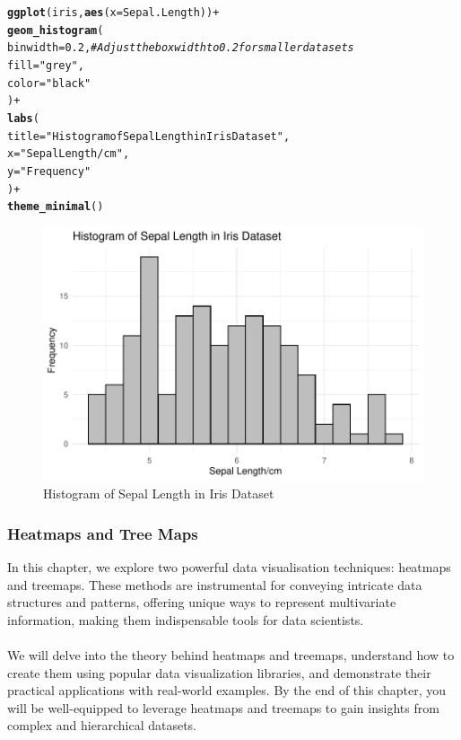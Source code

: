 \documentclass{article}\usepackage[]{graphicx}\usepackage[]{xcolor}
\makeatletter
\def\maxwidth{ %
  \ifdim\Gin@nat@width>\linewidth
    \linewidth
  \else
    \Gin@nat@width
  \fi
}
\newcommand{\hlnum}[1]{\textcolor[rgb]{0.686,0.059,0.569}{#1}}%
\newcommand{\hlstr}[1]{\textcolor[rgb]{0.192,0.494,0.8}{#1}}%
\newcommand{\hlcom}[1]{\textcolor[rgb]{0.678,0.584,0.686}{\textit{#1}}}%
\newcommand{\hlopt}[1]{\textcolor[rgb]{0,0,0}{#1}}%
\newcommand{\hlstd}[1]{\textcolor[rgb]{0.345,0.345,0.345}{#1}}%
\newcommand{\hlkwc}[1]{\textcolor[rgb]{0.333,0.667,0.333}{#1}}%
\newcommand{\hlkwd}[1]{\textcolor[rgb]{0.737,0.353,0.396}{\textbf{#1}}}%
\newenvironment{kframe}{%
 \def\at@end@of@kframe{}%
 \ifinner\ifhmode%
  \def\at@end@of@kframe{\end{minipage}}%
  \begin{minipage}{\columnwidth}%
 \fi\fi%
 \def\FrameCommand##1{\hskip\@totalleftmargin \hskip-\fboxsep
 \colorbox{shadecolor}{##1}\hskip-\fboxsep
     \hskip-\linewidth \hskip-\@totalleftmargin \hskip\columnwidth}%
 \MakeFramed {\advance\hsize-\width
   \@totalleftmargin\z@ \linewidth\hsize
   \@setminipage}}%
 {\par\unskip\endMakeFramed%
 \at@end@of@kframe}
\newenvironment{knitrout}{}{} %
\makeatother
\begin{document}
\begin{knitrout}
\color{fgcolor}\begin{kframe}
\begin{alltt}
\hlkwd{ggplot}\hlstd{(iris,} \hlkwd{aes}\hlstd{(}\hlkwc{x} \hlstd{= Sepal.Length))} \hlopt{+}
  \hlkwd{geom_histogram}\hlstd{(}
    \hlkwc{binwidth} \hlstd{=} \hlnum{0.2}\hlstd{,}  \hlcom{# Adjust the box width to 0.2 for smaller data sets}
    \hlkwc{fill} \hlstd{=} \hlstr{"grey"}\hlstd{,}
    \hlkwc{color} \hlstd{=} \hlstr{"black"}
  \hlstd{)} \hlopt{+}
  \hlkwd{labs}\hlstd{(}
    \hlkwc{title} \hlstd{=} \hlstr{"Histogram of Sepal Length in Iris Dataset"}\hlstd{,}
    \hlkwc{x} \hlstd{=} \hlstr{"Sepal Length/cm"}\hlstd{,}
    \hlkwc{y} \hlstd{=} \hlstr{"Frequency"}
  \hlstd{)} \hlopt{+}
  \hlkwd{theme_minimal}\hlstd{()}
\end{alltt}
\end{kframe}\begin{figure}
\includegraphics[width=\maxwidth]{figure/hist3-1} \caption[Histogram of Sepal Length in Iris Dataset]{Histogram of Sepal Length in Iris Dataset}\label{fig:hist3}
\end{figure}

\end{knitrout}

\subsubsection{Heatmaps and Tree Maps}
In this chapter, we explore two powerful data visualisation techniques: heatmaps and treemaps. These methods are instrumental for conveying intricate data structures and patterns, offering unique ways to represent multivariate information, making them indispensable tools for data scientists.
\\  
\\We will delve into the theory behind heatmaps and treemaps, understand how to create them using popular data visualization libraries, and demonstrate their practical applications with real-world examples. By the end of this chapter, you will be well-equipped to leverage heatmaps and treemaps to gain insights from complex and hierarchical datasets.
\end{document}
